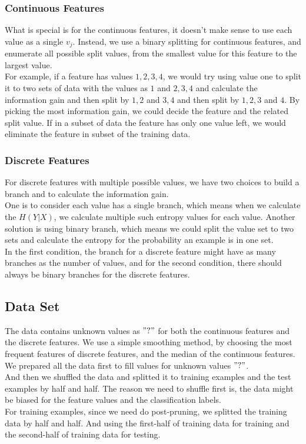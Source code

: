 \documentclass[11pt]{article}
\begin{document}
\subsubsection{Continuous Features}
What is special is for the continuous features, it doesn't make sense to use each value as a single $v_j$.
Instead, we use a binary splitting for continuous features, and enumerate all possible split values, from the smallest value
for this feature to the largest value. \\
For example, if a feature has values $1, 2, 3, 4$, we would try using value one to split it to two sets of data
with the values as $1$ and $2, 3, 4$ and calculate the information gain and then split by $1, 2$ and $3, 4$ and then 
split by $1, 2, 3$ and $4$. By picking the most information gain, we could decide the feature and the related split value.
If in a subset of data the feature has only one value left, we would eliminate the feature in subset of the training data. \\
\subsubsection{Discrete Features}
For discrete features with multiple possible values, we have two choices to build a branch and to calculate the information gain. \\
One is to consider each value has a single branch, which means when we calculate the $H(Y|X)$, we calculate multiple such entropy values for each value. Another solution is using binary branch, which means we could split the value set to two sets and calculate the entropy for the probability an example is in one set. \\
In the first condition, the branch for a discrete feature might have as many branches as the number of values, and for the second condition, there should always be binary branches for the discrete features.


\subsection{Data Set}
The data contains unknown values as $"?"$ for both the continuous features and the discrete features. We use a simple smoothing method,
by choosing the most frequent features of discrete features, and the median of the continuous features. \\
We prepared all the data first to fill values for unknown values $"?"$. \\
And then we shuffled the data and splitted it to training examples and the test examples by half and half. The reason we
need to shuffle first is, the data might be biased for the feature values and the classification labels. \\
For training examples, since we need do post-pruning, we splitted the training data by half and half. And using the first-half
of training data for training and the second-half of training data for testing.
\end{document}
